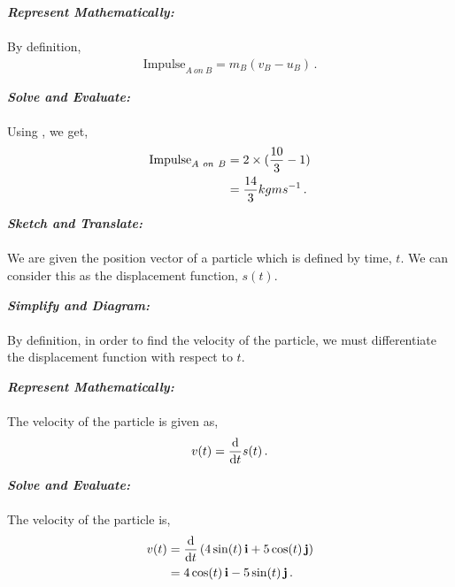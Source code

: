 \begin{subquestions}
\begin{subsubquestions}
\textbf{\textit{Represent Mathematically:}} \\ \\
By definition,
\begin{align}
	\text{Impulse}_{A~on~B} = m_B(v_B-u_B) \label{2008M:q5:Impulse} \,.
\end{align}




\textbf{\textit{Solve and Evaluate:}} \\ \\
Using , we get,
\begin{align}
	\text{Impulse}_{A~on~B} & = 2\times (\frac{10}{3}-1) \nonumber \\
						    & = \frac{14}{3} kgms^{-1} \,.
\end{align}

\end{subsubquestions}	


\subquestion

\begin{subsubquestions}
	
\subsubquestion

\textbf{\textit{Sketch and Translate:}} \\ \\
We are given the position vector of a particle which is defined by time, $t$. We can consider this as the displacement function, $s(t)$.




\textbf{\textit{Simplify and Diagram:}} \\ \\
By definition, in order to find the velocity of the particle, we must differentiate the displacement function with respect to $t$.




\textbf{\textit{Represent Mathematically:}} \\ \\
The velocity of the particle is given as,
\begin{equation}
	v(t) = \frac{\mathrm{d}}{\mathrm{d}t} s(t) \,.
\end{equation}




\textbf{\textit{Solve and Evaluate:}} \\ \\
The velocity of the particle is,
\begin{align}
	v(t) & = \frac{\mathrm{d}}{\mathrm{d}t} \left(4\sin(t)\,\mathbf{i} + 5\cos(t)\,\mathbf{j} \right) \nonumber \\
	     & = 4\cos(t) \,\mathbf{i} -5\sin(t) \,\mathbf{j}\,.
\end{align}


\end{subsubquestions}
\end{subquestions}
